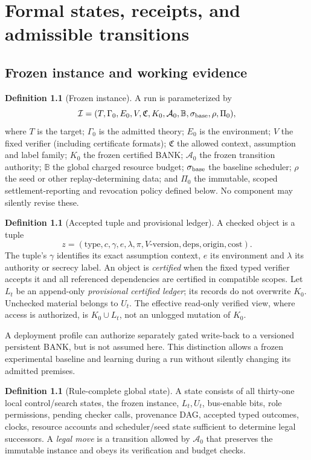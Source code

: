 \documentclass[11pt,letterpaper,oneside]{book}
\theoremstyle{definition}
\newtheorem{definition}[theorem]{Definition}
\theoremstyle{remark}
\begin{document}
\chapter{Formal states, receipts, and admissible transitions}
\section{Frozen instance and working evidence}
\begin{definition}[Frozen instance]
A run is parameterized by
\[
\mathcal I=(T,\Gamma_0,E_0,V,\mathfrak C, K_0,\mathcal A_0,
\mathbb B,\sigma_{\rm base},\rho,\Pi_0),
\]
where $T$ is the target; $\Gamma_0$ is the admitted theory; $E_0$ is
the environment; $V$ the fixed verifier (including certificate formats);
$\mathfrak C$ the allowed context, assumption and label family;
$K_0$ the frozen certified BANK; $\mathcal A_0$ the frozen transition
authority; $\mathbb B$ the global charged resource budget;
$\sigma_{\rm base}$ the baseline scheduler; $\rho$ the seed or
other replay-determining data; and $\Pi_0$ the immutable, scoped
settlement-reporting and revocation policy defined below. No component
may silently revise these.
\end{definition}

\begin{definition}[Accepted tuple and provisional ledger]
A checked object is a tuple
\[
 z=(\text{type},c,\gamma,e,\lambda,\pi,V\text{-version},
 \mathrm{deps},\mathrm{origin},\mathrm{cost}) .
\]
The tuple's $\gamma$ identifies its exact assumption context, $e$ its
environment and $\lambda$ its authority or secrecy label. An object is
\emph{certified} when the fixed typed verifier accepts it and all
referenced dependencies are certified in compatible scopes. Let $L_t$
be an append-only \emph{provisional certified ledger}; its records do
not overwrite $K_0$. Unchecked material belongs to $U_t$.
The effective read-only verified view, where access is authorized, is
$K_0\cup L_t$, not an unlogged mutation of $K_0$.
\end{definition}

A deployment profile can authorize separately gated write-back to a
versioned persistent BANK, but is not assumed here. This distinction
allows a frozen experimental baseline and learning during a run without
silently changing its admitted premises.

\begin{definition}[Rule-complete global state]
A state consists of all thirty-one local control/search states, the
frozen instance, $L_t,U_t$, bus-enable bits, role permissions, pending
checker calls, provenance DAG, accepted typed outcomes, clocks,
resource accounts and scheduler/seed state sufficient to determine
legal successors. A \emph{legal move} is a transition allowed by
$\mathcal A_0$ that preserves the immutable instance and obeys its
verification and budget checks.
\end{definition}
\end{document}
